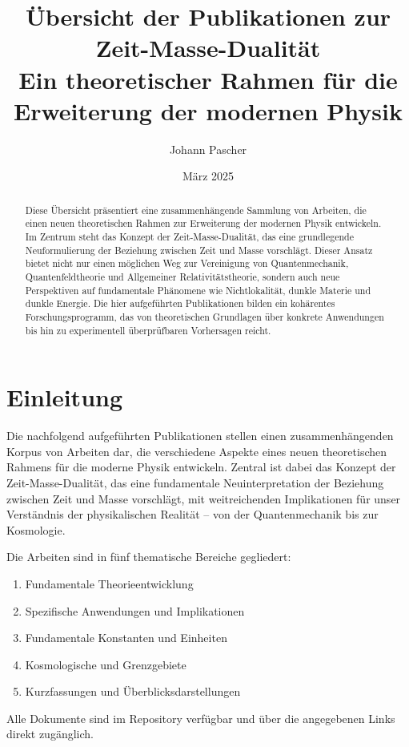 \documentclass[a4paper,12pt]{article}
\title{Übersicht der Publikationen zur Zeit-Masse-Dualität \\ \Large{Ein theoretischer Rahmen für die Erweiterung der modernen Physik}}
\author{Johann Pascher}
\date{März 2025}
\begin{document}
	
	\maketitle
	
	\begin{abstract}
		Diese Übersicht präsentiert eine zusammenhängende Sammlung von Arbeiten, die einen neuen theoretischen Rahmen zur Erweiterung der modernen Physik entwickeln. Im Zentrum steht das Konzept der Zeit-Masse-Dualität, das eine grundlegende Neuformulierung der Beziehung zwischen Zeit und Masse vorschlägt. Dieser Ansatz bietet nicht nur einen möglichen Weg zur Vereinigung von Quantenmechanik, Quantenfeldtheorie und Allgemeiner Relativitätstheorie, sondern auch neue Perspektiven auf fundamentale Phänomene wie Nichtlokalität, dunkle Materie und dunkle Energie. Die hier aufgeführten Publikationen bilden ein kohärentes Forschungsprogramm, das von theoretischen Grundlagen über konkrete Anwendungen bis hin zu experimentell überprüfbaren Vorhersagen reicht.
	\end{abstract}
	
	\section{Einleitung}
	
	Die nachfolgend aufgeführten Publikationen stellen einen zusammenhängenden Korpus von Arbeiten dar, die verschiedene Aspekte eines neuen theoretischen Rahmens für die moderne Physik entwickeln. Zentral ist dabei das Konzept der Zeit-Masse-Dualität, das eine fundamentale Neuinterpretation der Beziehung zwischen Zeit und Masse vorschlägt, mit weitreichenden Implikationen für unser Verständnis der physikalischen Realität – von der Quantenmechanik bis zur Kosmologie.
	
	Die Arbeiten sind in fünf thematische Bereiche gegliedert:
	\begin{enumerate}
		\item Fundamentale Theorieentwicklung
		\item Spezifische Anwendungen und Implikationen
		\item Fundamentale Konstanten und Einheiten
		\item Kosmologische und Grenzgebiete
		\item Kurzfassungen und Überblicksdarstellungen
	\end{enumerate}
	
	Alle Dokumente sind im Repository verfügbar und über die angegebenen Links direkt zugänglich.
	
\end{document}
